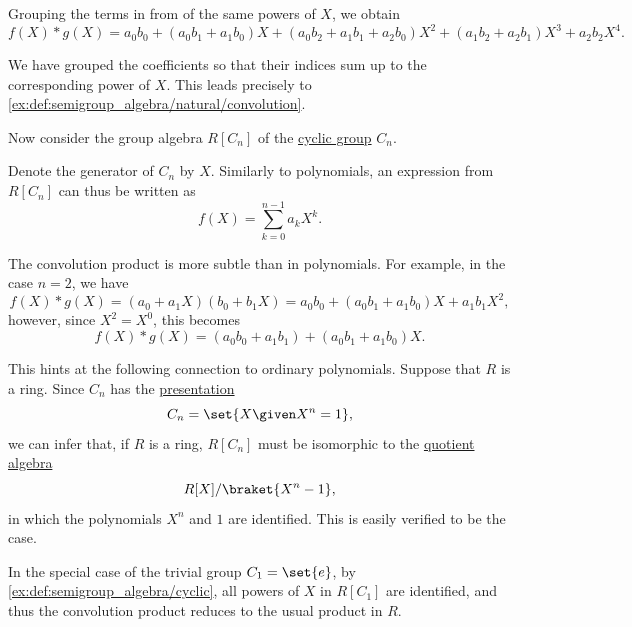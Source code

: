 \begin{example}
\begin{thmenum}
    Grouping the terms in from of the same powers of \( X \), we obtain
    \small
    \begin{equation*}
      f(X) \ast g(X) = a_0 b_0 + (a_0 b_1 + a_1 b_0) X + (a_0 b_2 + a_1 b_1 + a_2 b_0) X^2 + (a_1 b_2 + a_2 b_1) X^3 + a_2 b_2 X^4.
    \end{equation*}
    \normalsize

    We have grouped the coefficients so that their indices sum up to the corresponding power of \( X \). This leads precisely to \eqref{ex:def:semigroup_algebra/natural/convolution}.

     Now consider the group algebra \( R[C_n] \) of the \hyperref[def:cyclic_group]{cyclic group} \( C_n \).

    Denote the generator of \( C_n \) by \( X \). Similarly to polynomials, an expression from \( R[C_n] \) can thus be written as
    \begin{equation*}
      f(X) = \sum_{k=0}^{n-1} a_k X^k.
    \end{equation*}

    The convolution product is more subtle than in polynomials. For example, in the case \( n = 2 \), we have
    \begin{equation*}
      f(X) \ast g(X) = (a_0 + a_1 X) (b_0 + b_1 X) = a_0 b_0 + (a_0 b_1 + a_1 b_0) X + a_1 b_1 X^2,
    \end{equation*}
    however, since \( X^2 = X^0 \), this becomes
    \begin{equation*}
      f(X) \ast g(X) = (a_0 b_0 + a_1 b_1) + (a_0 b_1 + a_1 b_0) X.
    \end{equation*}

    This hints at the following connection to ordinary polynomials. Suppose that \( R \) is a ring. Since \( C_n \) has the \hyperref[def:group_presentation]{presentation}
    \begin{equation*}
      C_n = \set{ X \given X^n = 1 },
    \end{equation*}
    we can infer that, if \( R \) is a ring, \( R[C_n] \) must be isomorphic to the \hyperref[def:algebra_over_ring/quotient]{quotient algebra}
    \begin{equation*}
      R[X] / \braket{ X^n - 1 },
    \end{equation*}
    in which the polynomials \( X^n \) and \( 1 \) are identified. This is easily verified to be the case.

     In the special case of the trivial group \( C_1 = \set{ e } \), by \cref{ex:def:semigroup_algebra/cyclic}, all powers of \( X \) in \( R[C_1] \) are identified, and thus the convolution product reduces to the usual product in \( R \).


\end{thmenum}
\end{example}
